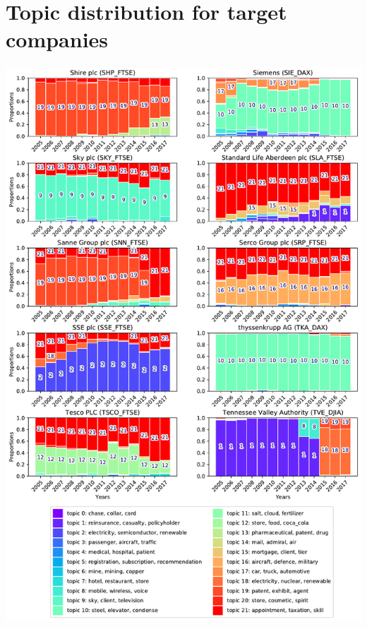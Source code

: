 \documentclass[12pt,journal,letterpaper,oneside,onecolumn]{IEEEtran}
\begin{document}
\section{Topic distribution for target companies}
\begin{center}
\includegraphics[width=0.85\linewidth]{images/companies_on_page_6.pdf}
\end{center}
\end{document}
